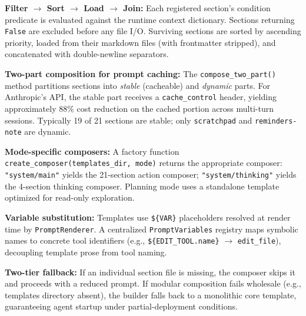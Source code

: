 \begin{packeditemize}
\item \textbf{Filter $\to$ Sort $\to$ Load $\to$ Join:} Each registered section's condition predicate is evaluated against the runtime context dictionary. Sections returning \texttt{False} are excluded before any file I/O. Surviving sections are sorted by ascending priority, loaded from their markdown files (with frontmatter stripped), and concatenated with double-newline separators.

\item \textbf{Two-part composition for prompt caching:} The \texttt{compose\_two\_part()} method partitions sections into \emph{stable} (cacheable) and \emph{dynamic} parts. For Anthropic's API, the stable part receives a \texttt{cache\_control} header, yielding approximately 88\% cost reduction on the cached portion across multi-turn sessions. Typically 19 of 21 sections are stable; only \texttt{scratchpad} and \texttt{reminders-note} are dynamic.

\item \textbf{Mode-specific composers:} A factory function \texttt{create\_composer(templates\_dir, mode)} returns the appropriate composer: \texttt{"system/main"} yields the 21-section action composer; \texttt{"system/thinking"} yields the 4-section thinking composer. Planning mode uses a standalone template optimized for read-only exploration.

\item \textbf{Variable substitution:} Templates use \texttt{\$\{VAR\}} placeholders resolved at render time by \texttt{PromptRenderer}. A centralized \texttt{PromptVariables} registry maps symbolic names to concrete tool identifiers (e.g., \texttt{\$\{EDIT\_TOOL.name\}} $\to$ \texttt{edit\_file}), decoupling template prose from tool naming.

\item \textbf{Two-tier fallback:} If an individual section file is missing, the composer skips it and proceeds with a reduced prompt. If modular composition fails wholesale (e.g., templates directory absent), the builder falls back to a monolithic core template, guaranteeing agent startup under partial-deployment conditions.
\end{packeditemize}


